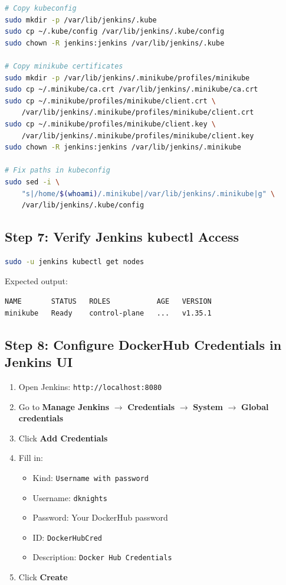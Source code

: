 \documentclass[12pt,a4paper]{article}
\begin{document}
\begin{lstlisting}[language=bash]
# Copy kubeconfig
sudo mkdir -p /var/lib/jenkins/.kube
sudo cp ~/.kube/config /var/lib/jenkins/.kube/config
sudo chown -R jenkins:jenkins /var/lib/jenkins/.kube

# Copy minikube certificates
sudo mkdir -p /var/lib/jenkins/.minikube/profiles/minikube
sudo cp ~/.minikube/ca.crt /var/lib/jenkins/.minikube/ca.crt
sudo cp ~/.minikube/profiles/minikube/client.crt \
    /var/lib/jenkins/.minikube/profiles/minikube/client.crt
sudo cp ~/.minikube/profiles/minikube/client.key \
    /var/lib/jenkins/.minikube/profiles/minikube/client.key
sudo chown -R jenkins:jenkins /var/lib/jenkins/.minikube

# Fix paths in kubeconfig
sudo sed -i \
    "s|/home/$(whoami)/.minikube|/var/lib/jenkins/.minikube|g" \
    /var/lib/jenkins/.kube/config
\end{lstlisting}

\subsection{Step 7: Verify Jenkins kubectl Access}

\begin{lstlisting}[language=bash]
sudo -u jenkins kubectl get nodes
\end{lstlisting}

Expected output:
\begin{verbatim}
NAME       STATUS   ROLES           AGE   VERSION
minikube   Ready    control-plane   ...   v1.35.1
\end{verbatim}

\subsection{Step 8: Configure DockerHub Credentials in Jenkins UI}

\begin{enumerate}
    \item Open Jenkins: \texttt{http://localhost:8080}
    \item Go to \textbf{Manage Jenkins} $\rightarrow$ \textbf{Credentials} $\rightarrow$ \textbf{System} $\rightarrow$ \textbf{Global credentials}
    \item Click \textbf{Add Credentials}
    \item Fill in:
    \begin{itemize}
        \item Kind: \texttt{Username with password}
        \item Username: \texttt{dknights}
        \item Password: Your DockerHub password
        \item ID: \texttt{DockerHubCred}
        \item Description: \texttt{Docker Hub Credentials}
    \end{itemize}
    \item Click \textbf{Create}
\end{enumerate}
\end{document}
